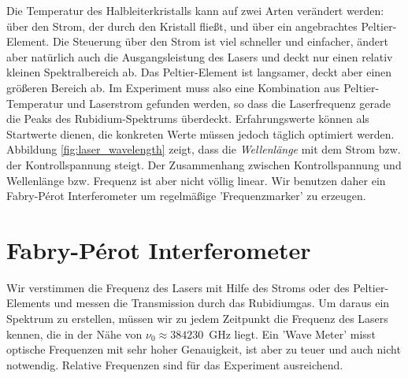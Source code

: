 \begin{marginfigure}
	\caption{Exemplarischer Zusammenhang zwischen Laserwellenlänge und Laserstrom (aus dem Datenblatt des Herstellers).}
	\label{fig:laser_wavelength}
\end{marginfigure}

Die Temperatur des Halbleiterkristalls kann auf zwei Arten verändert werden: über den Strom, der durch den Kristall fließt, und über ein angebrachtes Peltier-Element. Die Steuerung über den Strom ist viel schneller und einfacher, ändert aber natürlich auch die Ausgangsleistung des Lasers und deckt nur einen relativ kleinen Spektralbereich ab. Das Peltier-Element ist langsamer, deckt aber einen größeren Bereich ab. Im Experiment muss also eine Kombination aus Peltier-Temperatur und Laserstrom gefunden werden, so dass die Laserfrequenz gerade die Peaks des Rubidium-Spektrums überdeckt. Erfahrungswerte können als Startwerte dienen, die konkreten Werte müssen jedoch täglich optimiert werden. Abbildung \ref{fig:laser_wavelength} zeigt, dass die \emph{Wellenlänge} mit dem Strom bzw. der Kontrollspannung steigt. Der Zusammenhang zwischen Kontrollspannung und Wellenlänge bzw. Frequenz ist aber nicht völlig linear. Wir benutzen daher ein Fabry-Pérot Interferometer um regelmäßige 'Frequenzmarker' zu erzeugen.

\section{Fabry-Pérot Interferometer}

Wir verstimmen die Frequenz des Lasers mit Hilfe des Stroms oder des Peltier-Elements und messen die Transmission durch das Rubidiumgas. Um daraus ein Spektrum zu erstellen, müssen wir zu jedem Zeitpunkt die Frequenz des Lasers kennen, die in der Nähe von $\nu_0 \approx 384 230$~GHz liegt. Ein 'Wave Meter' misst optische Frequenzen mit sehr hoher Genauigkeit, ist aber zu teuer und auch nicht notwendig. Relative Frequenzen sind für das Experiment ausreichend.

\begin{marginfigure}
	\caption{Transmission durch das Fabry-Perot-Interferometer. Bei etwa 109~mA und 115~mA sind Modensprünge zu erkennen. Der Abstand der Peaks entspricht dem FSR.}
\end{marginfigure}

